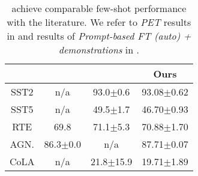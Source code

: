 \begin{table}[t!]
\scriptsize\centering\renewcommand{\arraystretch}{1.3}\setlength{\tabcolsep}{3pt}
\begin{tabular}{c|c|c|c}
      &\citet{PETpaper,schick2020s} & \citet{gao-etal-2021-making}   & Ours        \\ \hline
SST2  &n/a                          & 93.0$\pm$0.6    &         93.08$\pm$0.62  \\
SST5  &n/a                          & 49.5$\pm$1.7    &         46.70$\pm$0.93 \\
RTE   &69.8                         & 71.1$\pm$5.3    &         70.88$\pm$1.70  \\
AGN.  &86.3$\pm$0.0                 &  n/a            &         87.71$\pm$0.07 \\
CoLA  &n/a                          & 21.8$\pm$15.9   &         19.71$\pm$1.89  \\
\end{tabular}
\caption{
  \mdrs achieve comparable few-shot performance with the
  literature. We refer to \emph{PET} results in
  \citet{PETpaper,schick2020s} and results
  of \emph{Prompt-based FT (auto) + demonstrations} 
  in \citet{gao-etal-2021-making}.
}
\end{table}

